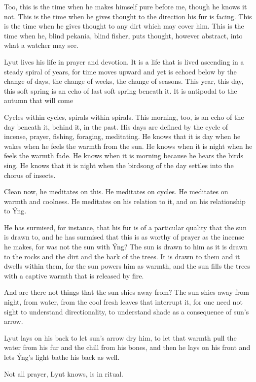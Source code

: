 Too, this is the time when he makes himself pure before me, though he knows it not. This is the time when he gives thought to the direction his fur is facing. This is the time when he gives thought to any dirt which may cover him. This is the time when he, blind pekania, blind fisher, puts thought, however abstract, into what a watcher may see.

\secdiv

Lyut lives his life in prayer and devotion. It is a life that is lived ascending in a steady spiral of years, for time moves upward and yet is echoed below by the change of days, the change of weeks, the change of seasons. This year, this day, this soft spring is an echo of last soft spring beneath it. It is antipodal to the autumn that will come

Cycles within cycles, spirals within spirals. This morning, too, is an echo of the day beneath it, behind it, in the past. His days are defined by the cycle of incense, prayer, fishing, foraging, meditating. He knows that it is day when he wakes when he feels the warmth from the sun. He knows when it is night when he feels the warmth fade. He knows when it is morning because he hears the birds sing. He knows that it is night when the birdsong of the day settles into the chorus of insects.

Clean now, he meditates on this. He meditates on cycles. He meditates on warmth and coolness. He meditates on his relation to it, and on his relationship to Ýng.

He has surmised, for instance, that his fur is of a particular quality that the sun is drawn to, and he has surmised that this is as worthy of prayer as the incense he makes, for was not the sun with Ýng? The sun is drawn to him as it is drawn to the rocks and the dirt and the bark of the trees. It is drawn to them and it dwells within them, for the sun powers him as warmth, and the sun fills the trees with a captive warmth that is released by fire.

And are there not things that the sun shies away from? The sun shies away from night, from water, from the cool fresh leaves that interrupt it, for one need not sight to understand directionality, to understand shade as a consequence of sun's arrow.

Lyut lays on his back to let sun's arrow dry him, to let that warmth pull the water from his fur and the chill from his bones, and then he lays on his front and lets Ýng's light bathe his back as well.

Not all prayer, Lyut knows, is in ritual.

